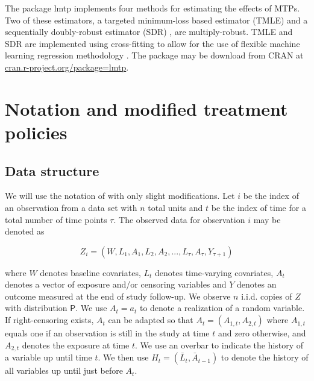 \documentclass[twoside,11pt]{article}
\newcommand{\Prob}{\mathsf{P}}
\begin{document}
The package lmtp implements four methods for estimating the effects of MTPs. Two of these estimators, a targeted minimum-loss based estimator (TMLE) \citep{laanTargetedLearningCausal2011a, laanTargetedMaximumLikelihood2006} and a sequentially doubly-robust estimator (SDR) \citep{buckleyLinearRegressionCensored1979, fanCensoredRegressionLocal1994, vanderlaanUnifiedCrossValidationMethodology2003, rotnitzkyDoublyRobustEstimation2006, rubinDoublyRobustCensoring2006, kennedyNonparametricMethodsDoubly2017}, are multiply-robust. TMLE and SDR are implemented using cross-fitting to allow for the use of flexible machine learning regression methodology \citep{jasaLMTP}. The package may be download from CRAN at \url{cran.r-project.org/package=lmtp}.

\hypertarget{notation-and-modified-treatment-policies}{%
\section{Notation and modified treatment policies}\label{notation-and-modified-treatment-policies}}

\hypertarget{data-structure}{\subsection{Data structure}\label{data-structure}}

We will use the notation of \citet{jasaLMTP} with only slight modifications.  Let $i$ be the index of an observation from a data set with $n$ total units and $t$ be the index of time for a total number of time points $\tau$.  The observed data for observation $i$ may be denoted as

\begin{equation}
Z_i = (W, L_1, A_1, L_2, A_2, ..., L_{\tau}, A_{\tau}, Y_{\tau + 1})
\end{equation}

where $W$ denotes baseline covariates, $L_t$ denotes time-varying covariates, $A_t$ denotes a vector of exposure and/or censoring variables and $Y$ denotes an outcome measured at the end of study follow-up. We observe $n$ i.i.d. copies of $Z$ with distribution $\Prob$. We use $A_t = a_t$ to denote a realization of a random variable. If right-censoring exists, $A_t$ can be adapted so that $A_t = (A_{1, t}, A_{2, t})$ where $A_{1, t}$ equals one if an observation is still in the study at time $t$ and zero otherwise, and $A_{2, t}$ denotes the exposure at time $t$. We use an overbar to indicate the history of a variable up until time $t$. We then use $H_t = (\bar{L}_t, \bar{A}_{t-1})$ to denote the history of all variables up until just before $A_t$.
\end{document}
